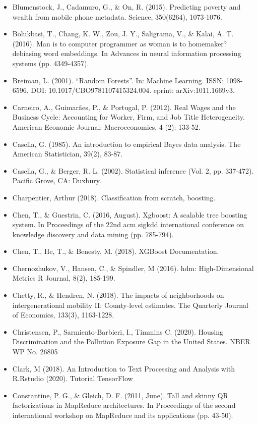 \documentclass[11pt]{article}
\begin{document}
\begin{itemize}
\item Blumenstock, J., Cadamuro, G., \& On, R. (2015). Predicting poverty and wealth from mobile phone metadata. Science, 350(6264), 1073-1076.
\item Bolukbasi, T., Chang, K. W., Zou, J. Y., Saligrama, V., \& Kalai, A. T. (2016). Man is to computer programmer as woman is to homemaker? debiasing word embeddings. In Advances in neural information processing systems (pp. 4349-4357).
\item Breiman, L. (2001). “Random Forests”. In: Machine Learning. ISSN: 1098-6596. DOI: 10.1017/CBO9781107415324.004. eprint: arXiv:1011.1669v3.
\item Carneiro, A., Guimarães, P., \& Portugal, P. (2012). Real Wages and the Business Cycle: Accounting for Worker, Firm, and Job Title Heterogeneity. American Economic Journal: Macroeconomics, 4 (2): 133-52.
\item Casella, G. (1985). An introduction to empirical Bayes data analysis. The American Statistician, 39(2), 83-87.
\item Casella, G., \& Berger, R. L. (2002). Statistical inference (Vol. 2, pp. 337-472). Pacific Grove, CA: Duxbury.
\item Charpentier, Arthur (2018). Classification from scratch, boosting.
\item Chen, T., \& Guestrin, C. (2016, August). Xgboost: A scalable tree boosting system. In Proceedings of the 22nd acm sigkdd international conference on knowledge discovery and data mining (pp. 785-794).
\item Chen, T., He, T., \& Benesty, M. (2018). XGBoost Documentation.
\item Chernozhukov, V.,  Hansen, C., \& Spindler, M (2016). hdm: High-Dimensional Metrics R Journal, 8(2), 185-199.
\item Chetty, R., \& Hendren, N. (2018). The impacts of neighborhoods on intergenerational mobility II: County-level estimates. The Quarterly Journal of Economics, 133(3), 1163-1228.
\item Christensen, P.,  Sarmiento-Barbieri, I., Timmins C. (2020). Housing Discrimination and the Pollution Exposure Gap in the United States. NBER WP No. 26805
\item Clark, M (2018). An Introduction to Text Processing and Analysis with R.Rstudio (2020). Tutorial TensorFlow
\item Constantine, P. G., \& Gleich, D. F. (2011, June). Tall and skinny QR factorizations in MapReduce architectures. In Proceedings of the second international workshop on MapReduce and its applications (pp. 43-50).

\end{itemize}
\end{document}

